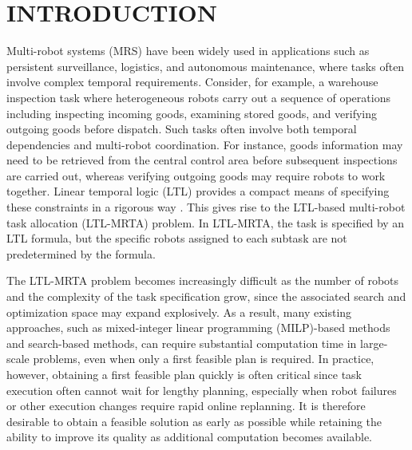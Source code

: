 \documentclass[lettersize,journal]{IEEEtran}
\theoremstyle{italiclemma}
\theoremstyle{italiclemma}
\theoremstyle{definition}
\begin{document}
\section{INTRODUCTION}
Multi-robot systems (MRS) have been widely used in applications such as persistent surveillance\cite{leahy2016persistent}, logistics\cite{LiRAL23}, and autonomous maintenance\cite{liu2024time}, where tasks often involve complex temporal requirements. Consider, for example, a warehouse inspection task where heterogeneous robots carry out a sequence of operations including inspecting incoming goods, examining stored goods, and verifying outgoing goods before dispatch. Such tasks often involve both temporal dependencies and multi-robot coordination. For instance, goods information may need to be retrieved from the central control area before subsequent inspections are carried out, whereas verifying outgoing goods may require robots to work together. Linear temporal logic (LTL) provides a compact means of specifying these constraints in a rigorous way \cite{baier2008principles,schillinger2018decomposition,11627658}. This gives rise to the LTL-based multi-robot task allocation (LTL-MRTA) problem. In LTL-MRTA, the task is specified by an LTL formula, but the specific robots assigned to each subtask are not predetermined by the formula\cite{luo2022temporal}.

 The LTL-MRTA problem becomes increasingly difficult as the number of robots and the complexity of the task specification grow, since the associated search and optimization space may expand explosively. As a result, many existing approaches, such as  mixed-integer linear programming (MILP)-based methods\cite{luo2022temporal, 9663414} and  search-based methods\cite{ulusoy2013optimality, kantaros2020stylus}, can require substantial computation time in large-scale problems, even when only a first feasible plan is required. In practice, however, obtaining a first feasible plan quickly is often critical since task execution often cannot wait for lengthy planning, especially when robot failures or other execution changes require rapid online replanning. It is therefore desirable to obtain a feasible solution as early as possible while retaining the ability to improve its quality as additional computation becomes available.
\end{document}
